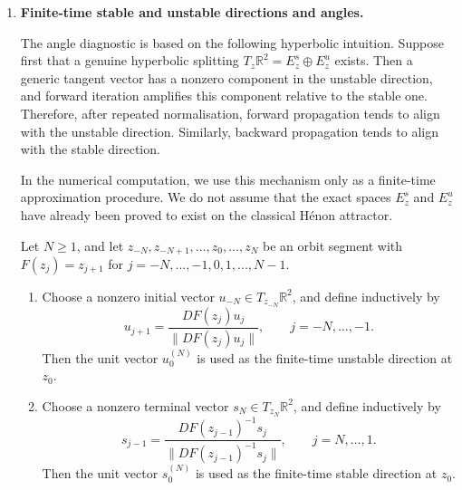 \begin{enumerate}

    
    \item \textbf{Finite-time stable and unstable directions and angles.}

    The angle diagnostic is based on the following hyperbolic intuition. Suppose first that a genuine hyperbolic splitting \(T_z\mathbb R^2=E_z^s\oplus E_z^u \) exists. Then a generic tangent vector has a nonzero component in the unstable direction, and forward iteration amplifies this component relative to the stable one. Therefore, after repeated normalisation, forward propagation tends to align with the unstable direction. Similarly, backward propagation tends to align with the stable direction.

    In the numerical computation, we use this mechanism only as a finite-time approximation procedure. We do not assume that the exact spaces \(E_z^s\) and \(E_z^u\) have already been proved to exist on the classical Hénon attractor.

    \begin{definition}
    Let \(N\geq 1\), and let $ z_{-N},z_{-N+1},\ldots,z_0,\ldots,z_N$ be an orbit segment with \(F(z_j)=z_{j+1}\) for $j=-N,...,-1, 0,1,...,N-1$.

    \begin{enumerate}[label=(\arabic*)]
        \item Choose a nonzero initial vector \(u_{-N}\in T_{z_{-N}}\mathbb R^2\), and define inductively by
            \[
            u_{j+1}
            =
            \frac{DF(z_j)u_j}{\|DF(z_j)u_j\|},
            \qquad
            j=-N,\ldots,-1.
            \]
        Then the unit vector \(u_0^{(N)}\) is used as the finite-time unstable direction at \(z_0\).

        \item Choose a nonzero terminal vector \(s_N\in T_{z_N}\mathbb R^2\), and define inductively by
            \[
            s_{j-1}
            =
            \frac{DF(z_{j-1})^{-1}s_j}{\|DF(z_{j-1})^{-1}s_j\|},
            \qquad
            j=N,\ldots,1.
            \]
        Then the unit vector \(s_0^{(N)}\) is used as the finite-time stable direction at \(z_0\).
        \end{enumerate}
    \end{definition}


\end{enumerate}

